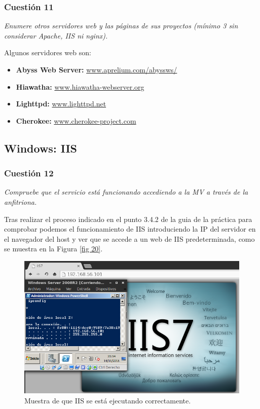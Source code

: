 \subsubsection{Cuestión 11}
\textit{Enumere otros servidores web y las páginas de sus proyectos (mínimo 3 sin considerar Apache, IIS ni nginx).}
\newline

Algunos servidores web son:
\begin{itemize}
  \item \textbf{Abyss Web Server: } \url{www.aprelium.com/abyssws/}
  \item \textbf{Hiawatha: } \url{www.hiawatha-webserver.org}
  \item \textbf{Lighttpd: } \url{www.lighttpd.net}
  \item \textbf{Cherokee: } \url{www.cherokee-project.com}
\end{itemize}






\subsection{Windows: IIS}
\subsubsection{Cuestión 12}
\textit{Compruebe que el servicio está funcionando accediendo a la MV a través de la anfitriona.}
\newline

Tras realizar el proceso indicado en el punto 3.4.2 de la guia de la práctica para comprobar podemos  el funcionamiento de IIS introduciendo la IP del servidor en el navegador del host y ver que se accede a un web de IIS predeterminada, como se muestra en la Figura \ref{fig 20}.

\begin{figure}[H]
    \begin{center}
        \includegraphics[scale=0.5]{imagenes/img20}
        \caption{Muestra de que IIS se está ejecutando correctamente.}
        \label{fig20}
    \end{center}
\end{figure}

